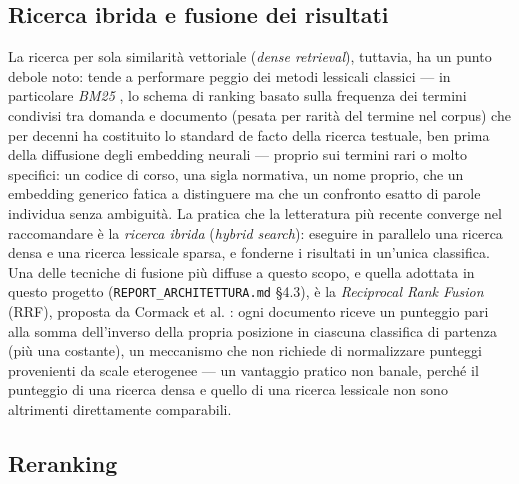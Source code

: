 \subsection{Ricerca ibrida e fusione dei risultati}

La ricerca per sola similarità vettoriale (\emph{dense retrieval}), tuttavia, ha un punto debole noto: tende a
performare peggio dei metodi lessicali classici --- in particolare \emph{BM25} \cite{robertson2009bm25}, lo schema di
ranking basato sulla frequenza dei termini condivisi tra domanda e documento (pesata per rarità del termine nel
corpus) che per decenni ha costituito lo standard de facto della ricerca testuale, ben prima della diffusione degli
embedding neurali --- proprio sui termini rari o molto specifici: un codice di corso, una sigla normativa, un nome
proprio, che un embedding generico fatica a distinguere ma che un confronto esatto di parole individua senza
ambiguità. La pratica che la letteratura più recente converge nel raccomandare è la
\emph{ricerca ibrida} (\emph{hybrid search}): eseguire in parallelo una ricerca densa e una ricerca lessicale sparsa,
e fonderne i risultati in un'unica classifica. Una delle tecniche di fusione più diffuse a questo scopo, e quella
adottata in questo progetto (\texttt{REPORT\_ARCHITETTURA.md} \S4.3), è la \emph{Reciprocal Rank Fusion} (RRF),
proposta da Cormack et al. \cite{cormack2009rrf}: ogni documento riceve un punteggio pari alla somma dell'inverso
della propria posizione in ciascuna classifica di partenza (più una costante), un meccanismo che non richiede di
normalizzare punteggi provenienti da scale eterogenee --- un vantaggio pratico non banale, perché il punteggio di una
ricerca densa e quello di una ricerca lessicale non sono altrimenti direttamente comparabili.

\subsection{Reranking}

